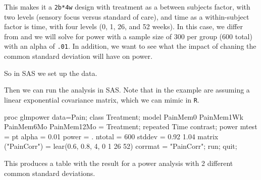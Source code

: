 \documentclass[
]{book}
\newenvironment{Shaded}{\begin{snugshade}}{\end{snugshade}}
\newcommand{\DecValTok}[1]{\textcolor[rgb]{0.00,0.00,0.81}{#1}}
\newcommand{\FloatTok}[1]{\textcolor[rgb]{0.00,0.00,0.81}{#1}}
\newcommand{\FunctionTok}[1]{\textcolor[rgb]{0.00,0.00,0.00}{#1}}
\newcommand{\NormalTok}[1]{#1}
\newcommand{\OtherTok}[1]{\textcolor[rgb]{0.56,0.35,0.01}{#1}}
\newcommand{\SpecialCharTok}[1]{\textcolor[rgb]{0.00,0.00,0.00}{#1}}
\newcommand{\StringTok}[1]{\textcolor[rgb]{0.31,0.60,0.02}{#1}}
\begin{document}
This makes it a \texttt{2b*4w} design with treatment as a between subjects factor, with two levels (sensory focus versus standard of care), and time as a within-subject factor is time, with four levels (0, 1, 26, and 52 weeks). In this case, we differ from \citet{SASglmpower} and we will solve for power with a sample size of 300 per group (600 total) with an alpha of \texttt{.01}. In addition, we want to see what the impact of chaning the common standard deviation will have on power.

So in SAS we set up the data.

\begin{Shaded}
\end{Shaded}

Then we can run the analysis in SAS. Note that in the example \citet{SASglmpower} are assuming a linear exponential covariance matrix, which we can mimic in \texttt{R}.

\begin{Shaded}
\begin{Highlighting}[]
\NormalTok{proc glmpower data}\OtherTok{=}\NormalTok{Pain;}
\NormalTok{class Treatment;}
\NormalTok{model PainMem0 PainMem1Wk PainMem6Mo PainMem12Mo }\OtherTok{=}\NormalTok{ Treatment;}
\NormalTok{repeated Time contrast;}
\NormalTok{power}
\NormalTok{mtest }\OtherTok{=}\NormalTok{ pt }
\NormalTok{alpha }\OtherTok{=} \FloatTok{0.01}
\NormalTok{power }\OtherTok{=}\NormalTok{ .}
\NormalTok{ntotal }\OtherTok{=} \DecValTok{600}
\NormalTok{stddev }\OtherTok{=} \FloatTok{0.92} \FloatTok{1.04}
\FunctionTok{matrix}\NormalTok{ (}\StringTok{"PainCorr"}\NormalTok{) }\OtherTok{=} \FunctionTok{lear}\NormalTok{(}\FloatTok{0.6}\NormalTok{, }\FloatTok{0.8}\NormalTok{, }\DecValTok{4}\NormalTok{, }\DecValTok{0} \DecValTok{1} \DecValTok{26} \DecValTok{52}\NormalTok{)}
\NormalTok{corrmat }\OtherTok{=} \StringTok{"PainCorr"}\NormalTok{;}
\NormalTok{run;}
\NormalTok{quit;}
\end{Highlighting}
\end{Shaded}

This produces a table with the result for a power analysis with 2 different common standard deviations.
\end{document}
